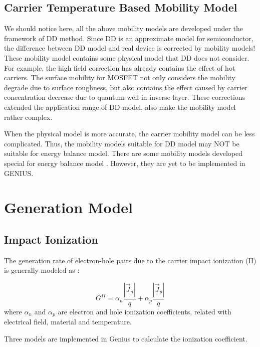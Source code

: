 \documentclass[oneside,12pt]{cgd_book}
\begin{document}
\subsection{Carrier Temperature Based Mobility Model}
We should notice here, all the above mobility models are developed under the framework of DD method. Since
        DD is an approximate model for semiconductor, the difference between DD model and real device is corrected by
        mobility models! These mobility model contains some physical model that DD does not consider. For example, the
        high field correction has already contains the effect of hot carriers. The surface mobility for MOSFET not only
        considers the mobility degrade due to surface roughness, but also contains the effect caused by carrier
        concentration decrease due to quantum well in inverse layer. These corrections extended the application range of
        DD model, also make the mobility model rather complex.
\par
When the physical model is more accurate, the carrier mobility model can be less complicated. Thus, the
        mobility models suitable for DD model may NOT be suitable for energy balance model. There are some mobility
        models developed special for energy balance model \cite[PISCES-2ET]{}. However, they are yet to be
        implemented in GENIUS.
\par
\section{Generation Model}
\subsection{Impact Ionization}
\label{sec:Equation:Generation:II}
The generation rate of electron-hole pairs due to the carrier impact ionization (II) is generally
        modeled as \cite[Sze1981]{}:
\par
\begin{equation}
G^{II} = \alpha_n \dfrac{\left\vert \vec{J}_n \right\vert }{q} + \alpha_p \dfrac{ \left\vert
          \vec{J}_p \right\vert }{q}
\end{equation}
where $\alpha_n$ and $\alpha_p$ are electron and
        hole ionization coefficients, related with electrical field, material and temperature.
\par
Three models are implemented in Genius to calculate the ionization coefficient.
\par
\end{document}
